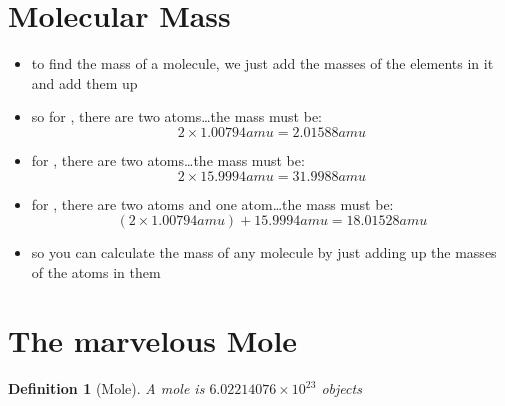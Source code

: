\documentclass[11pt, oneside]{article}   	%
\newtheorem{definition}{Definition}
\begin{document}
\section{Molecular Mass}
\begin{itemize}
\item to find the mass of a molecule, we just add the masses of the elements in it and add them up
\item so for , there are two  atoms\ldots the mass must be:\\
$$ 2 \times 1.00794 amu = 2.01588 amu$$
\item for , there are two  atoms\ldots the mass must be:\\
 $$ 2 \times 15.9994 amu = 31.9988 amu $$
\item for , there are two   atoms and one  atom\ldots the mass must be: \\
$$ ( 2 \times 1.00794 amu ) + 15.9994 amu = 18.01528 amu$$
\item so you can calculate the mass of any molecule by just adding up the masses of the atoms in them
\end{itemize}

\section{The marvelous Mole}

\begin{definition}[Mole]\label{defn:mole}
A mole is $6.02214076 \times 10^{23}$  objects
\end{definition}
\end{document}
